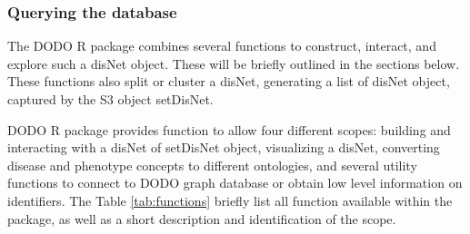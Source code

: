 \documentclass[9pt,a4paper,]{extarticle}
\begin{document}
\hypertarget{querying-the-database}{%
\subsubsection{Querying the database}\label{querying-the-database}}

The DODO R package combines several functions to construct, interact, and explore such a disNet object. These will be briefly outlined in the sections below. These functions also split or cluster a disNet, generating a list of disNet object, captured by the S3 object setDisNet.

DODO R package provides function to allow four different scopes: building and interacting with a disNet of setDisNet object, visualizing a disNet, converting disease and phenotype concepts to different ontologies, and several utility functions to connect to DODO graph database or obtain low level information on identifiers. The Table \ref{tab:functions} briefly list all function available within the package, as well as a short description and identification of the scope.
\end{document}
